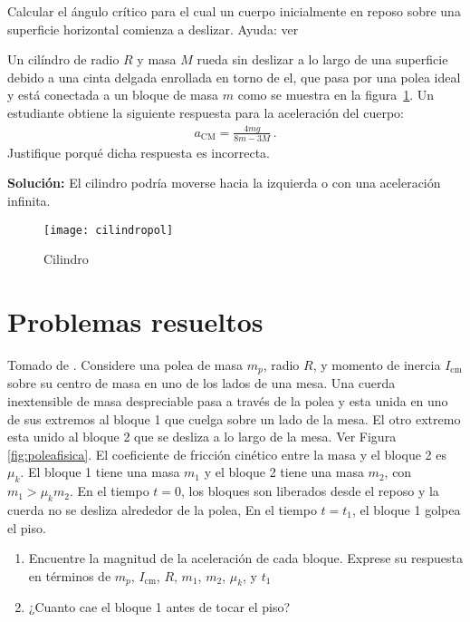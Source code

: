 \ejercicio{}
Calcular el ángulo crítico para el cual un cuerpo inicialmente en reposo sobre una superficie horizontal comienza a deslizar. Ayuda: ver 




\ejemplo{}
Un cilíndro de radio $R$ y masa $M$ rueda sin deslizar a lo largo
    de una superficie debido a una cinta delgada enrollada en torno de
    el, que pasa por una polea ideal y está conectada a un bloque de
    masa $m$ como se muestra en la figura~\ref{fig:cilindropol}. Un estudiante obtiene la siguiente respuesta para la aceleración del cuerpo:
    \begin{align*}
      a_{\text{CM}}=\frac{4mg}{8m-3M}\,.
    \end{align*}
Justifique porqué dicha respuesta es incorrecta. 


\noindent
\textbf{Solución:} El cilindro podría moverse hacia la izquierda o con una aceleración infinita.


\begin{figure}
  \centering
  \texttt{[image: cilindropol]}
  \caption{Cilindro}
  \label{fig:cilindropol}
\end{figure}




\section{Problemas resueltos}

\ejemplo{}
Tomado de \cite{mit2009}. Considere una polea de masa $m_p$, radio $R$, y momento de inercia $I_{\text{cm}}$ sobre su centro de masa en uno de los lados de una mesa. Una cuerda inextensible de masa despreciable pasa a través de la polea y esta unida en uno de sus extremos al bloque 1 que cuelga sobre un lado de la mesa. El otro extremo esta unido al bloque 2 que se desliza a lo largo de la mesa. Ver Figura \ref{fig:poleafisica}. El coeficiente de fricción cinético entre la masa y el bloque 2 es $\mu_k$. El bloque 1 tiene una masa $m_1$ y el bloque 2 tiene una masa $m_2$, con $m_1>\mu_k m_2$. En el tiempo $t=0$, los bloques son liberados desde el reposo y la cuerda no se desliza alrededor de la polea,  En el tiempo $t=t_1$, el bloque 1 golpea el piso.
  \begin{enumerate}
  \item Encuentre la magnitud de la aceleración de cada bloque. Exprese su respuesta en términos de $m_p$, $I_{\text{cm}}$, $R$, $m_1$, $m_2$, $\mu_k$, y $t_1$
    \label{item:4}
  \item ¿Cuanto cae el bloque 1 antes de tocar el piso?
    \label{item:5}
  \end{enumerate}

